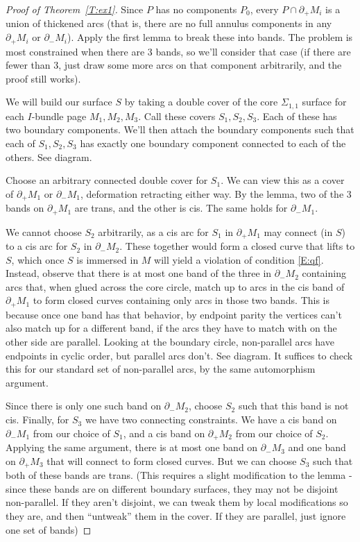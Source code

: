 \documentclass[12pt]{amsart}
\theoremstyle{definition}
\theoremstyle{remark}
\newcommand{\bd}{\partial}
\newcommand{\Si}{\Sigma}
\begin{document}
\begin{proof}[Proof of Theorem~\ref{T:ex1}]

Since $P$ has no components $P_0$, every $P \cap \bd_+M_i$ is a union of
thickened arcs (that is, there are no full annulus components in any $\bd_+M_i$
or $\bd_-M_i$). Apply the first lemma to break these into bands. The problem is
most constrained when there are 3 bands, so we'll consider that case (if there
are fewer than 3, just draw some more arcs on that component arbitrarily, and
the proof still works).

We will build our surface $S$ by taking a double cover of the core $\Si_{1,1}$
surface for each $I$-bundle page $M_1,M_2,M_3$. Call these covers
$S_1,S_2,S_3$.  Each of these has two boundary components. We'll then attach
the boundary components such that each of $S_1,S_2,S_3$ has exactly one
boundary component connected to each of the others. See diagram.

Choose an arbitrary connected double cover for $S_1$. We can view this as
a cover of $\bd_+M_1$ or $\bd_-M_1$, deformation retracting either way. By the
lemma, two of the
3 bands on $\bd_+M_1$ are trans, and the other is cis. The same holds for
  $\bd_-M_1$.

We cannot choose $S_2$ arbitrarily, as a cis arc for $S_1$ in $\bd_+M_1$ may
connect (in $S$) to a cis arc for $S_2$ in $\bd_-M_2$. These together would
form a closed curve that lifts to $S$, which once $S$ is immersed in $M$ will
yield a violation of condition \eqref{E:qf}. Instead, observe that there is at
most one band of the three in $\bd_-M_2$ containing arcs that, when glued
across the core circle, match up to arcs in the cis band of $\bd_+M_1$ to form
closed curves containing only arcs in those two bands. This is because once one
band has that behavior, by endpoint parity the vertices can't also match up for
a different band, if the arcs they have to match with on the other side are
parallel. Looking at the boundary circle, non-parallel arcs have endpoints in
cyclic order, but parallel arcs don't. See diagram. It suffices to check this
for our standard set of non-parallel arcs, by the same automorphism argument.

Since there is only one such band on $\bd_-M_2$, choose $S_2$ such that this
band is not cis.  Finally, for $S_3$ we have two connecting constraints. We
have a cis band on $\bd_-M_1$ from our choice of $S_1$, and a cis band on
$\bd_+M_2$ from our choice of $S_2$.  Applying the same argument, there is at
most one band on $\bd_-M_3$ and one band on $\bd_+M_3$ that will connect to
form closed curves. But we can choose $S_3$ such that both of these bands are
trans. (This requires a slight modification to the lemma - since these bands
are on different boundary surfaces, they may not be disjoint non-parallel. If
they aren't disjoint, we can tweak them by local modifications so they are, and
then ``untweak'' them in the cover. If they are parallel, just ignore one set
of bands)


\end{proof}
\end{document}
